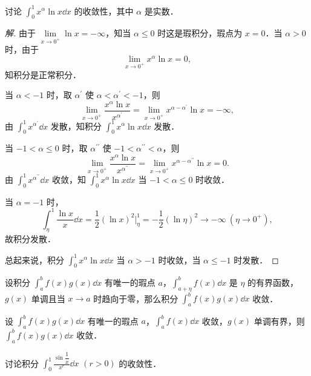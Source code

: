 \begin{example}\label{ex:11-2-3}
讨论 $\displaystyle\int_{0}^{1}x^{\alpha}\ln x\dd x$ 的收敛性，其中 $\alpha$ 是实数．
\end{example}

\begin{proof}[解]
由于 $\lim\limits_{x\to 0^{+}}\ln x=-\infty$，知当 $\alpha\leqslant 0$ 时这是瑕积分，瑕点为 $x=0$．当 $\alpha>0$ 时，由于
\[
\lim_{x\to 0^{+}}x^{\alpha}\ln x=0,
\]
知积分是正常积分．

当 $\alpha<-1$ 时，取 $\alpha^{\prime}$ 使 $\alpha<\alpha^{\prime}<-1$，则
\[
\lim_{x\to 0^{+}}\frac{x^{\alpha}\ln x}{x^{\alpha^{\prime}}}=\lim_{x\to 0^{+}}x^{\alpha-\alpha^{\prime}}\ln x=-\infty,
\]
由 $\displaystyle\int_{0}^{1}x^{\alpha^{\prime}}\dd x$ 发散，知积分 $\displaystyle\int_{0}^{1}x^{\alpha}\ln x\dd x$ 发散．

当 $-1<\alpha\leqslant 0$ 时，取 $\alpha^{\prime\prime}$ 使 $-1<\alpha^{\prime\prime}<\alpha$，则
\[
\lim_{x\to 0^{+}}\frac{x^{\alpha}\ln x}{x^{\alpha^{\prime\prime}}}=\lim_{x\to 0^{+}}x^{\alpha-\alpha^{\prime\prime}}\ln x=0.
\]
由 $\displaystyle\int_{0}^{1}x^{\alpha^{\prime\prime}}\dd x$ 收敛，知 $\displaystyle\int_{0}^{1}x^{\alpha}\ln x\dd x$ 当 $-1<\alpha\leqslant 0$ 时收敛．

当 $\alpha=-1$ 时，
\[
\int_{\eta}^{1}\frac{\ln x}{x}\dd x=\frac{1}{2}(\ln x)^{2}\bigg|_{\eta}^{1}=-\frac{1}{2}(\ln\eta)^{2}\to-\infty\ (\eta\to 0^{+}),
\]
故积分发散．

总起来说，积分 $\displaystyle\int_{0}^{1}x^{\alpha}\ln x\dd x$ 当 $\alpha>-1$ 时收敛，当 $\alpha\leqslant -1$ 时发散．
\end{proof}

\begin{theorem}[狄利克雷判别法]\label{thm:11-11}
设积分 $\displaystyle\int_{a}^{b}f(x)g(x)\dd x$ 有唯一的瑕点 $a$，$\displaystyle\int_{a+\eta}^{b}f(x)\dd x$ 是 $\eta$ 的有界函数，$g(x)$ 单调且当 $x\to a$ 时趋向于零，那么积分 $\displaystyle\int_{a}^{b}f(x)g(x)\dd x$ 收敛．
\end{theorem}

\begin{theorem}[阿贝尔判别法]\label{thm:11-12}
设 $\displaystyle\int_{a}^{b}f(x)g(x)\dd x$ 有唯一的瑕点 $a$，$\displaystyle\int_{a}^{b}f(x)\dd x$ 收敛，$g(x)$ 单调有界，则 $\displaystyle\int_{a}^{b}f(x)g(x)\dd x$ 收敛．
\end{theorem}

\begin{example}\label{ex:11-2-4}
讨论积分 $\displaystyle\int_{0}^{1}\frac{\sin\dfrac{1}{x}}{x^{r}}\dd x$ $(r>0)$ 的收敛性．
\end{example}

